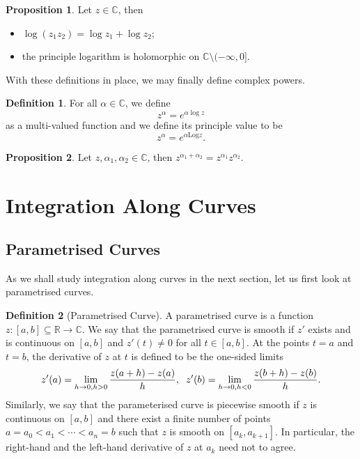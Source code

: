 \documentclass[
]{article}
\theoremstyle{definition}
\newtheorem{prop}{Proposition}
\theoremstyle{definition}
\newtheorem{definition}{Definition}[section]
\begin{document}
\begin{prop}
  Let \(z \in \mathbb{C}\), then 
  \begin{itemize}
    \item \(\log(z_1 z_2) = \log z_1 + \log z_2\);
    \item  the principle logarithm is holomorphic on \(\mathbb{C} \setminus (-\infty, 0]\).
  \end{itemize}
\end{prop}

With these definitions in place, we may finally define complex powers.

\begin{definition}
  For all \(\alpha \in \mathbb{C}\), we define 
  \[z^\alpha = e^{\alpha \log z}\]
  as a multi-valued function and we define its principle value to be 
  \[z^\alpha = e^{\alpha \text{Log} z}.\]
\end{definition}
\begin{prop}
  Let \(z, \alpha_1, \alpha_2 \in \mathbb{C}\), then 
  \(z^{\alpha_1 + \alpha_2} = z^{\alpha_1}z^{\alpha_2}\).
\end{prop}

\newpage

\hypertarget{integration-along-curves}{%
\section{Integration Along Curves}\label{integration-along-curves}}

\hypertarget{parametrised-curves}{%
\subsection{Parametrised Curves}\label{parametrised-curves}}

As we shall study integration along curves in the next section, let us
first look at parametrised curves.

\begin{definition}[Parametrised Curve]
  A parametrised curve is a function \(z : [a, b] \subseteq \mathbb{R} \to \mathbb{C}\).
  We say that the parametrised curve is smooth if \(z'\) exists and is continuous 
  on \([a, b]\) and \(z'(t) \neq 0\) for all \(t \in [a, b]\). At the points 
  \(t = a\) and \(t = b\), the derivative of \(z\) at \(t\) is defined to be the 
  one-sided limits 
  \[z'(a) = \lim_{h \to 0, h > 0} \frac{z(a + h) - z(a)}{h}, \hspace{2mm} 
    z'(b) = \lim_{h \to 0, h < 0} \frac{z(b + h) - z(b)}{h}.\]
  Similarly, we say that the parameterised curve is piecewise smooth if \(z\) is 
  continuous on \([a, b]\) and there exist a finite number of points 
  \(a = a_0 < a_1 < \cdots < a_n = b\) such that \(z\) is smooth on \([a_k, a_{k + 1}]\). 
  In particular, the right-hand and the left-hand derivative of \(z\) at \(a_k\) need not 
  to agree.
\end{definition}
\end{document}
